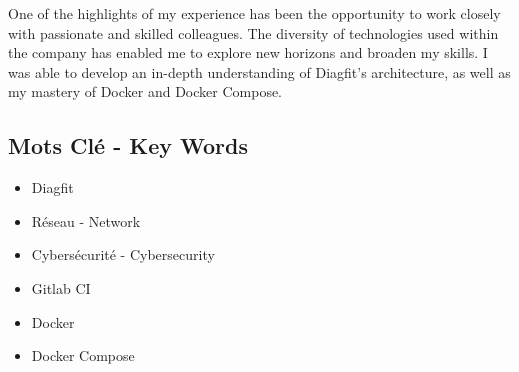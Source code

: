 One of the highlights of my experience has been the opportunity to work closely with passionate and skilled colleagues.
The diversity of technologies used within the company has enabled me to explore new horizons and broaden my skills.
I was able to develop an in-depth understanding of Diagfit's architecture, as well as my mastery of Docker and Docker Compose.

\subsection*{Mots Clé - Key Words}
\begin{itemize}
    \item Diagfit
    \item Réseau - Network
    \item Cybersécurité - Cybersecurity
    \item Gitlab CI
    \item Docker
    \item Docker Compose
\end{itemize}
